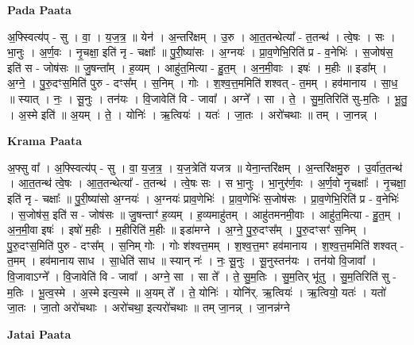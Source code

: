 \documentclass[17pt]{extarticle}
\begin{document}
\textbf{Pada Paata} \newline

अ॒फ्स्वित्य॑प् - सु । वा॒ । य॒ज॒त्र॒ ॥ येन॑ । अ॒न्तरि॑क्षम् । उ॒रु । आ॒त॒तन्थेत्या᳚ - त॒तन्थ॑ । त्वे॒षः । सः । भा॒नुः । अ॒र्ण॒वः । नृ॒चक्षा॒ इति॑ नृ - चक्षाः᳚ ॥ पु॒री॒ष्या॑सः । अ॒ग्नयः॑ । प्रा॒व॒णेभि॒रिति॑ प्र - व॒नेभिः॑ । स॒जोष॑स॒ इति॑ स - जोष॑सः ॥ जु॒षन्ता᳚म् । ह॒व्यम् । आहु॑त॒मित्या - हु॒त॒म् । अ॒न॒मी॒वाः । इषः॑ । म॒हीः ॥ इडा᳚म् । अ॒ग्ने॒ । पु॒रु॒दꣳस॒मिति॑ पुरु - दꣳस᳚म् । स॒निम् । गोः । श॒श्व॒त्त॒ममिति॑ शश्वत् - त॒मम् । हव॑मानाय । सा॒ध॒ ॥ स्यात् । नः॒ । सू॒नुः । तन॑यः । वि॒जावेति॑ वि - जावा᳚ । अग्ने᳚ । सा । ते॒ । सु॒म॒तिरिति॑ सु-म॒तिः । भू॒तु॒ । अ॒स्मे इति॑ ॥ अ॒यम् । ते॒ । योनिः॑ । ऋ॒त्वियः॑ । यतः॑ । जा॒तः । अरो॑चथाः ॥ तम् । जा॒नन्न् ।  \newline


\textbf{Krama Paata} \newline

अ॒फ्सु वा᳚ । अ॒फ्स्वित्य॑प् - सु । वा॒ य॒ज॒त्र॒ । य॒ज॒त्रेति॑ यजत्र ॥ येना॒न्तरि॑क्षम् । अ॒न्तरि॑क्षमु॒रु । उ॒र्वा॑त॒तन्थ॑ । आ॒त॒तन्थ॑ त्वे॒षः । आ॒त॒तन्थेत्या᳚ - त॒तन्थ॑ । त्वे॒षः सः । स भा॒नुः । भा॒नुर॑र्ण॒वः । अ॒र्ण॒वो नृ॒चक्षाः᳚ । नृ॒चक्षा॒ इति॑ नृ - चक्षाः᳚ ॥ पु॒री॒ष्या॑सो अ॒ग्नयः॑ । अ॒ग्नयः॑ प्राव॒णेभिः॑ । प्रा॒व॒णेभिः॑ स॒जोष॑सः । प्रा॒व॒णेभि॒रिति॑ प्र - व॒नेभिः॑ । स॒जोष॑स॒ इति॑ स - जोष॑सः ॥ जु॒षन्ताꣳ॑ ह॒व्यम् । ह॒व्यमाहु॑तम् । आहु॑तमनमी॒वाः । आहु॑त॒मित्या - हु॒त॒म् । अ॒न॒मी॒वा इषः॑ । इषो॑ म॒हीः । म॒हीरिति॑ म॒हीः ॥ इडा॑मग्ने । अ॒ग्ने॒ पु॒रु॒दꣳस᳚म् । पु॒रु॒दꣳसꣳ॑ स॒निम् । पु॒रु॒दꣳस॒मिति॑ पुरु - दꣳस᳚म् । स॒निम् गोः । गोः श॑श्वत्त॒मम् । श॒श्व॒त्त॒मꣳ हव॑मानाय । श॒श्व॒त्त॒ममिति॑ शश्वत् - त॒मम् । हव॑मानाय साध । सा॒धेति॑ साध ॥ स्यान् नः॑ । नः॒ सू॒नुः । सू॒नुस्तन॑यः । तन॑यो वि॒जावा᳚ । वि॒जावाऽग्ने᳚ । वि॒जावेति॑ वि - जावा᳚ । अग्ने॒ सा । सा ते᳚ । ते॒ सु॒म॒तिः । सु॒म॒तिर् भू॑तु । सु॒म॒तिरिति॑ सु - म॒तिः । भू॒त्व॒स्मे । अ॒स्मे इत्य॒स्मे ॥ अ॒यम् ते᳚ । ते॒ योनिः॑ । योनि॑र्. ऋ॒त्वियः॑ । ऋ॒त्वियो॒ यतः॑ । यतो॑ जा॒तः । जा॒तो अरो॑चथाः । अरो॑चथा॒ इत्यरो॑चथाः ॥ तम् जा॒नन्न् । जा॒नन्न॑ग्ने \newline

\textbf{Jatai Paata} \newline
\end{document}

